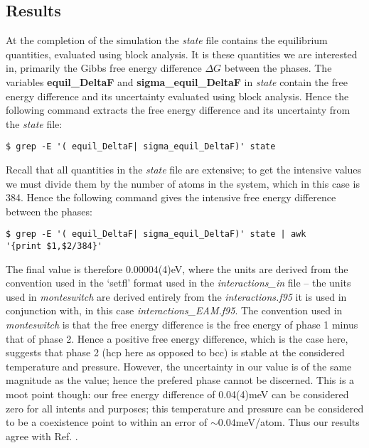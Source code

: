 \documentclass{report}
\begin{document}
\subsection{Results}
At the completion of the simulation the \emph{state} file contains the equilibrium quantities, evaluated using block analysis. It is these quantities we
are interested in, primarily the Gibbs free energy difference $\Delta G$ between the phases. The variables \textbf{equil\_DeltaF} and 
\textbf{sigma\_equil\_DeltaF} in \emph{state} contain the free energy difference and its uncertainty evaluated using block analysis.
Hence the following command extracts the free energy difference and its uncertainty from the \emph{state} file:
\begin{verbatim}
$ grep -E '( equil_DeltaF| sigma_equil_DeltaF)' state
\end{verbatim}
Recall that all quantities in the \emph{state} file are extensive; to get the intensive values we must divide them by the number of atoms in the system, which
in this case is 384. Hence the following command gives the intensive free energy difference between the phases:
\begin{verbatim}
$ grep -E '( equil_DeltaF| sigma_equil_DeltaF)' state | awk
'{print $1,$2/384}'
\end{verbatim}
The final value is therefore 0.00004(4)eV, where the units are derived from the convention used in the `setfl' format used in the \emph{interactions\_in}
file -- the units used in \emph{monteswitch} are derived entirely from the \emph{interactions.f95} it is used in conjunction with, in this case 
\emph{interactions\_EAM.f95}.
The convention used in \emph{monteswitch} is that the free energy difference is the free energy of phase 1 minus that of phase 2. Hence a positive free energy
difference, which is the case here, suggests that phase 2 (hcp here as opposed to bcc) is stable at the considered temperature and pressure. 
However, the uncertainty in our value is of the same magnitude as the value; hence the prefered phase cannot be discerned. This is a moot point though:
our free energy difference of 0.04(4)meV can be considered zero for all intents and purposes; this temperature and pressure can be considered to be
a coexistence point to within an error of $\sim 0.04$meV/atom. Thus our results agree with Ref. \cite{Mendelev_2007}.
\end{document}
